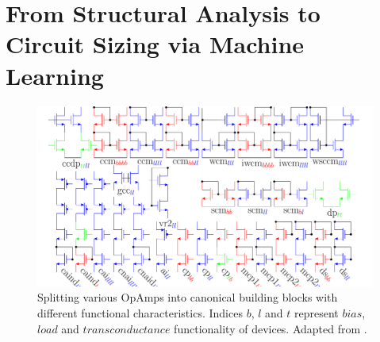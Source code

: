 \documentclass[conference]{IEEEtran}
\begin{document}
	 
	 	
 	\section{From Structural Analysis to Circuit Sizing via Machine Learning}\label{sec:intro2}
	\begin{figure}[h]
		\centering
        \includegraphics[width=\linewidth]{figures/struct_overview_incl_partition}
		\setlength{\abovecaptionskip}{0ex}%
		\setlength{\belowcaptionskip}{-2ex}%
		\caption{Splitting various OpAmps into canonical building blocks with different functional characteristics. Indices {\color{red} $b$}, {\color{blue} $l$} and {\color{green} $t$} represent {\color{red}$bias$}, {\color{blue}$load$} and {\color{green}$transconductance$} functionality of devices. Adapted from \cite{leibl24inverse}.}
		\label{fig:overview-structure}
	\end{figure}
	\setlength{\abovecaptionskip}{1ex}%
	\setlength{\belowcaptionskip}{-3ex}%
\end{document}
